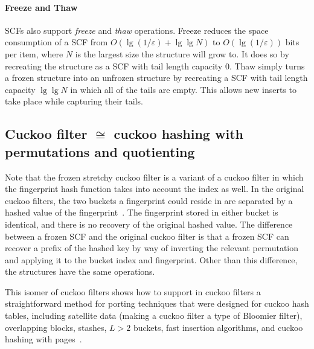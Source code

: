 \documentclass[letterpaper,twocolumn,10pt]{article}
\newcommand{\taffy}{stretchy}
\newcommand{\TCF}{SCF}
\newcommand{\taffy}{taffy}
\newcommand{\TCF}{TCF}
\begin{document}
\paragraph{Freeze and Thaw}
\TCF{}s also support {\em freeze} and {\em thaw} operations.
Freeze reduces the space consumption of a \TCF{} from $O(\lg(1/\varepsilon) + \lg \lg N)$ to $O(\lg (1 / \varepsilon))$ bits per item, where $N$ is the largest size the structure will grow to.
It does so by recreating the structure as a \TCF{} with tail length capacity $0$.
Thaw simply turns a frozen structure into an unfrozen structure by recreating a \TCF{} with tail length capacity $\lg \lg N$ in which all of the tails are empty.
This allows new inserts to take place while capturing their tails.

\subsection{Cuckoo filter $\cong$ cuckoo hashing with permutations and quotienting}
\label{dictionary}

Note that the frozen \taffy{} cuckoo filter is a variant of a cuckoo filter in which the fingerprint hash function takes into account the index as well.
In the original cuckoo filters, the two buckets a fingerprint could reside in are separated by a hashed value of the fingerprint~\cite{cuckoo}.
The fingerprint stored in either bucket is identical, and there is no recovery of the original hashed value.
The difference between a frozen \TCF{} and the original cuckoo filter is that a frozen \TCF{} can recover a prefix of the hashed key by way of inverting the relevant permutation and applying it to the bucket index and fingerprint.
Other than this difference, the structures have the same operations.

This isomer of cuckoo filters shows how to support in cuckoo filters a straightforward method for porting techniques that were designed for cuckoo hash tables, including satellite data (making a cuckoo filter a type of Bloomier filter), overlapping blocks, stashes, $L > 2$ buckets, fast insertion algorithms, and cuckoo hashing with pages~\cite{cuckoo-simple,cuckoo-overlap,stash,d-ary,d-ary-filter,vertical,bloomier,cuckoo-linear-insertion,cuckoo-simd-insert,cuckoo-pages,cuckoo-pages-non-contiguous}.


\end{document}
